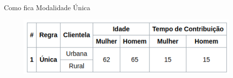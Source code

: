 \begin{frame}{Como fica}
  Modalidade Única
  \begin{figure}[h]
  	\begin{center}
      \includegraphics [scale=0.6]{./Figures/comofica}
  	\end{center}
  \end{figure}
\end{frame}






%

